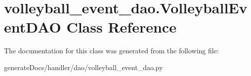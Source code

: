 \hypertarget{classvolleyball__event__dao_1_1_volleyball_event_d_a_o}{}\section{volleyball\+\_\+event\+\_\+dao.\+Volleyball\+Event\+D\+AO Class Reference}
\label{classvolleyball__event__dao_1_1_volleyball_event_d_a_o}


The documentation for this class was generated from the following file\+:\begin{DoxyCompactItemize}
\item 
generate\+Docs/handler/dao/volleyball\+\_\+event\+\_\+dao.\+py\end{DoxyCompactItemize}
